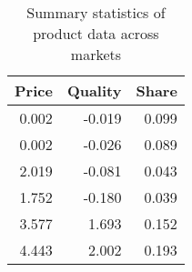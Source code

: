 \begin{table}
\centering
\caption{Summary statistics of product data across markets}
\label{tabSummaryBLP}
\begin{tabular}{rrr}
\toprule
 Price &  Quality &  Share \\
\midrule
 0.002 &   -0.019 &  0.099 \\
 0.002 &   -0.026 &  0.089 \\
 2.019 &   -0.081 &  0.043 \\
 1.752 &   -0.180 &  0.039 \\
 3.577 &    1.693 &  0.152 \\
 4.443 &    2.002 &  0.193 \\
\bottomrule
\end{tabular}
\end{table}
